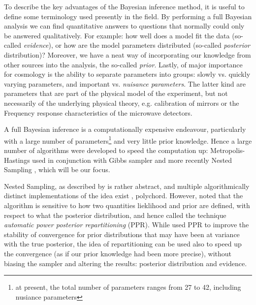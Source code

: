 \documentclass[usenatbib]{mnras}
\begin{document}
To describe the key advantages of the Bayesian inference method, it
is useful to define some terminology used presently in the field.
By performing a full Bayesian analysis we can find quantitative
answers to questions that normally could only be answered
qualitatively. For example: how well does a model fit the data
(so-called \emph{evidence}), or how are the model parameters distributed
(so-called \emph{posterior} distribution)?
Moreover, we have a neat way
of incorporating our knowledge from other sources into the analysis,
the so-called \emph{prior}. Lastly, of major importance for cosmology is
the ability to separate parameters into groups: slowly vs. quickly
varying parameters, and important vs. \emph{nuisance parameters}. The
latter kind are parameters that are part of the physical model of
the experiment, but not necessarily of the underlying physical
theory, e.g. calibration of mirrors or the Frequency response
characteristics of the microwave detectors. 

A full Bayesian inference is a computationally expensive endeavour,
particularly with a large number of parameters\footnote{at present, the total number of parameters ranges from 27 to 42, including nusiance parameters} 
and very little prior knowledge. Hence a large number of algorithms were developed to speed the computation up: Metropolis-Hastings \citep{Metropolis} used in conjunction with Gibbs sampler \citep{Metropolis-hastings-gibbs} and more recently Nested Sampling \citep{skilling2006}, which will be our focus. 

Nested Sampling, as described by \citeauthor{skilling2006} is rather abstract, and multiple algorithmically distinct implementations of the idea exist \citep{Feroz2009MultiNestAE}, polychord. However, \cite{chen-ferroz-hobson} noted that the algorithm is sensitive to how two quantities lieklihood and prior are defined, with respect to what the posterior distribution, and hence called the technique \emph{automatic power posterior repartitioning} (PPR). While \citeauthor{chen-ferroz-hobson} used PPR to improve the stability of convergence for prior distributions that may have been at variance with the true posterior, the idea of repartitioning can be used also to speed up the convergence (as if our prior knowledge had been more precise), without biasing the sampler and altering the results: posterior distribution and evidence. 
\end{document}
